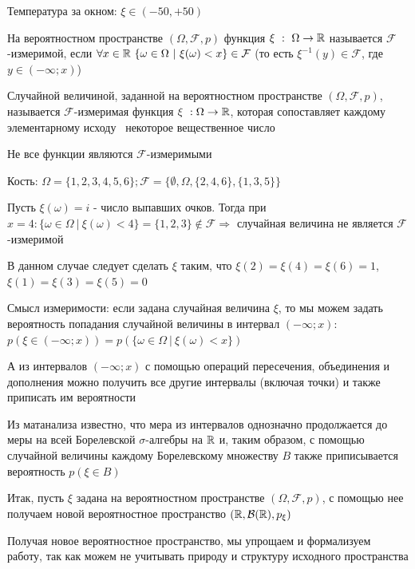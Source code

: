 \documentclass[12pt]{article}
\begin{document}
     Температура за окном: $\xi \in (-50, +50)$

    \Def На вероятностном пространстве $(\Omega, \mathcal{F}, p)$ функция $\xi \ : \ \Omega \to \mathbb{R}$ называется
    $\mathcal{F}$-измеримой, если $\forall x \in \mathbb{R} \ \{\omega \in \Omega \ | \ \xi(\omega) < x\} \in \mathcal{F}$
    (то есть $\xi^{-1}(y) \in \mathcal{F}$, где $y \in (-\infty; x)$)

    \Def Случайной величиной, заданной на вероятностном пространстве $(\Omega, \mathcal{F}, p)$, называется
    $\mathcal{F}$-измеримая функция $\xi \ : \Omega \to \mathbb{R}$, которая сопоставляет каждому элементарному исходу \
    некоторое вещественное число

    \Nota Не все функции являются $\mathcal{F}$-измеримыми

    \Exs Кость: $\Omega = \{1, 2, 3, 4, 5, 6\}; \mathcal{F} = \{\emptyset, \Omega, \{2, 4, 6\}, \{1, 3, 5\}\}$

    Пусть $\xi(\omega) = i$ - число выпавших очков. Тогда при $x = 4: \{\omega \in \Omega \ | \ \xi (\omega) < 4\} = \{1, 2, 3\} \notin \mathcal{F} \Longrightarrow$ случайная величина не является $\mathcal{F}$-измеримой

    В данном случае следует сделать $\xi$ таким, что $\xi(2) = \xi(4) = \xi(6) = 1$, $\xi(1) = \xi(3) = \xi(5) = 0$

    \Nota Смысл измеримости: если задана случайная величина $\xi$, то мы можем задать вероятность попадания случайной
    величины в интервал $(-\infty; x)$: $p(\xi \in (-\infty; x)) = p(\{\omega \in \Omega \ | \ \xi(\omega) < x\})$

    А из интервалов $(-\infty; x)$ с помощью операций пересечения, объединения и дополнения можно получить все другие
    интервалы (включая точки) и также приписать им вероятности

    Из матанализа известно, что мера из интервалов однозначно продолжается до меры на всей Борелевской $\sigma$-алгебры на $\mathbb{R}$
    и, таким образом, с помощью случайной величины каждому Борелевскому множеству $B$ также приписывается вероятность $p(\xi \in B)$

    Итак, пусть $\xi$ задана на вероятностном пространстве $(\Omega, \mathcal{F}, p)$, с помощью нее получаем новой вероятностное
    пространство $(\mathbb{R}, \mathcal{B}(\mathbb{R}), p_\xi)$

    Получая новое вероятностное пространство, мы упрощаем и формализуем работу, так как можем не учитывать природу и структуру исходного пространства
\end{document}

